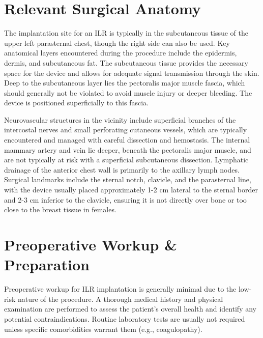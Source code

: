 \section*{Relevant Surgical Anatomy}
The implantation site for an ILR is typically in the subcutaneous tissue of the upper left parasternal chest, though the right side can also be used. Key anatomical layers encountered during the procedure include the epidermis, dermis, and subcutaneous fat. The subcutaneous tissue provides the necessary space for the device and allows for adequate signal transmission through the skin. Deep to the subcutaneous layer lies the pectoralis major muscle fascia, which should generally not be violated to avoid muscle injury or deeper bleeding. The device is positioned superficially to this fascia.

Neurovascular structures in the vicinity include superficial branches of the intercostal nerves and small perforating cutaneous vessels, which are typically encountered and managed with careful dissection and hemostasis. The internal mammary artery and vein lie deeper, beneath the pectoralis major muscle, and are not typically at risk with a superficial subcutaneous dissection. Lymphatic drainage of the anterior chest wall is primarily to the axillary lymph nodes. Surgical landmarks include the sternal notch, clavicle, and the parasternal line, with the device usually placed approximately 1-2 cm lateral to the sternal border and 2-3 cm inferior to the clavicle, ensuring it is not directly over bone or too close to the breast tissue in females.

\section*{Preoperative Workup \& Preparation}
Preoperative workup for ILR implantation is generally minimal due to the low-risk nature of the procedure. A thorough medical history and physical examination are performed to assess the patient's overall health and identify any potential contraindications. Routine laboratory tests are usually not required unless specific comorbidities warrant them (e.g., coagulopathy).

